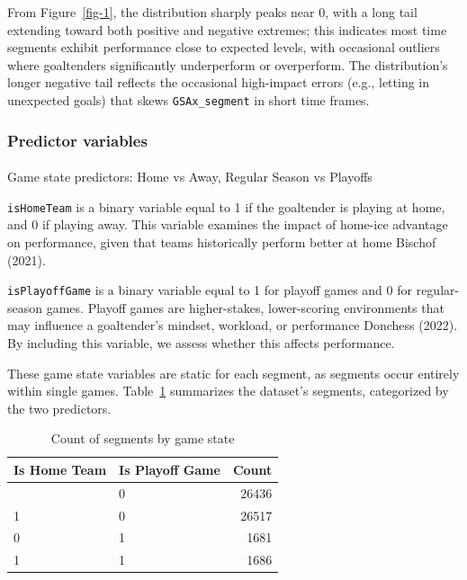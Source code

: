 \documentclass[
  letterpaper,
  DIV=11,
  numbers=noendperiod]{scrartcl}
\makeatletter
\let\oldparagraph\paragraph
\renewcommand{\paragraph}{
    \@ifstar
      \xxxParagraphStar
      \xxxParagraphNoStar
  }
\newcommand{\xxxParagraphStar}[1]{\oldparagraph*{#1}\mbox{}}
\newcommand{\xxxParagraphNoStar}[1]{\oldparagraph{#1}\mbox{}}
\makeatother
\begin{document}
From Figure~\ref{fig-1}, the distribution sharply peaks near 0, with a
long tail extending toward both positive and negative extremes; this
indicates most time segments exhibit performance close to expected
levels, with occasional outliers where goaltenders significantly
underperform or overperform. The distribution's longer negative tail
reflects the occasional high-impact errors (e.g., letting in unexpected
goals) that skews \texttt{GSAx\_segment} in short time frames.

\subsubsection{Predictor variables}\label{predictor-variables}

\paragraph{Game state predictors: Home vs Away, Regular Season vs
Playoffs}\label{game-state-predictors-home-vs-away-regular-season-vs-playoffs}

\texttt{isHomeTeam} is a binary variable equal to 1 if the goaltender is
playing at home, and 0 if playing away. This variable examines the
impact of home-ice advantage on performance, given that teams
historically perform better at home Bischof (2021).

\texttt{isPlayoffGame} is a binary variable equal to 1 for playoff games
and 0 for regular-season games. Playoff games are higher-stakes,
lower-scoring environments that may influence a goaltender's mindset,
workload, or performance Donchess (2022). By including this variable, we
assess whether this affects performance.

These game state variables are static for each segment, as segments
occur entirely within single games. Table~\ref{tbl-2} summarizes the
dataset's segments, categorized by the two predictors.

\begin{longtable}[]{@{}llr@{}}

\caption{\label{tbl-2}Count of segments by game state}

\tabularnewline

\toprule\noalign{}
Is Home Team & Is Playoff Game & Count \\
\midrule\noalign{}
\endhead
\bottomrule\noalign{}
\endlastfoot
0 & 0 & 26436 \\
1 & 0 & 26517 \\
0 & 1 & 1681 \\
1 & 1 & 1686 \\

\end{longtable}
\end{document}
